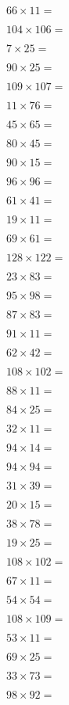 \documentclass{numbersense}
\begin{document}
\begin{questions}
\q[726] $66 \times 11 = $\ans

\q[11024] $104 \times 106 = $\ans

\q[175] $7 \times 25 = $\ans

\q[2250] $90 \times 25 = $\ans

\q[11663] $109 \times 107 = $\ans

\q[836] $11 \times 76 = $\ans

\q[2925] $45 \times 65 = $\ans

\q[3600] $80 \times 45 = $\ans

\q[1350] $90 \times 15 = $\ans

\q[9216] $96 \times 96 = $\ans

\q[2501] $61 \times 41 = $\ans

\q[209] $19 \times 11 = $\ans

\q[4209] $69 \times 61 = $\ans

\q[15616] $128 \times 122 = $\ans

\q[1909] $23 \times 83 = $\ans

\q[9310] $95 \times 98 = $\ans

\q[7221] $87 \times 83 = $\ans

\q[1001] $91 \times 11 = $\ans

\q[2604] $62 \times 42 = $\ans

\q[11016] $108 \times 102 = $\ans

\q[968] $88 \times 11 = $\ans

\q[2100] $84 \times 25 = $\ans

\q[352] $32 \times 11 = $\ans

\q[1316] $94 \times 14 = $\ans

\q[8836] $94 \times 94 = $\ans

\q[1209] $31 \times 39 = $\ans

\q[300] $20 \times 15 = $\ans

\q[2964] $38 \times 78 = $\ans

\q[475] $19 \times 25 = $\ans

\q[11016] $108 \times 102 = $\ans

\q[737] $67 \times 11 = $\ans

\q[2916] $54 \times 54 = $\ans

\q[11772] $108 \times 109 = $\ans

\q[583] $53 \times 11 = $\ans

\q[1725] $69 \times 25 = $\ans

\q[2409] $33 \times 73 = $\ans

\q[9016] $98 \times 92 = $\ans


\end{questions}
\end{document}
